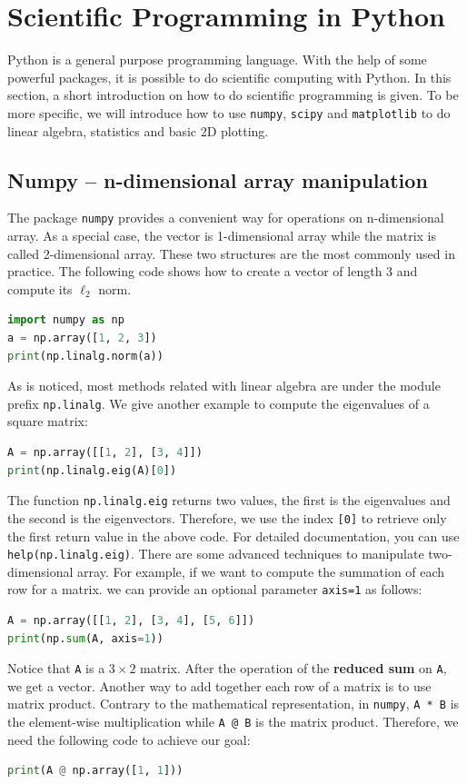 \documentclass[10pt]{article}
\begin{document}
\section{Scientific Programming in Python}
Python is a general purpose programming language.
With the help of some powerful packages, it is
possible to do scientific computing with Python.
In this section, a short introduction on how to
do scientific programming is given. To be more
specific, we will introduce how to use \texttt{numpy},
\texttt{scipy} and \texttt{matplotlib} to do linear algebra, statistics and basic 2D plotting.
\subsection{Numpy -- n-dimensional array manipulation}
The package \texttt{numpy} provides a convenient way for operations on n-dimensional array. As a special case, the vector is 1-dimensional array while the matrix is called 2-dimensional array. These two structures are the most commonly
used in practice. The following code shows how to create a vector of length 3 and compute its $\ell_2$ norm.
\begin{lstlisting}[language=Python]
import numpy as np
a = np.array([1, 2, 3])
print(np.linalg.norm(a))
\end{lstlisting}
As is noticed, most methods related with linear algebra are
under the module prefix \texttt{np.linalg}. We give another example to compute the eigenvalues of a square matrix:
\begin{lstlisting}[language=Python,firstnumber=4]
A = np.array([[1, 2], [3, 4]])
print(np.linalg.eig(A)[0])
\end{lstlisting}
The function \texttt{np.linalg.eig} returns two values,
the first is the eigenvalues and the second is the eigenvectors. Therefore, we use the index \texttt{[0]} to retrieve
only the first return value in the above code.
For detailed documentation, you can use \texttt{help(np.linalg.eig)}.
There are some advanced techniques to manipulate two-dimensional array. For example, if we want to compute
the summation of each row for a matrix. we can provide an
optional parameter \texttt{axis=1} as follows:
\begin{lstlisting}[language=Python, firstnumber=6]
A = np.array([[1, 2], [3, 4], [5, 6]])
print(np.sum(A, axis=1))
\end{lstlisting}
Notice that \texttt{A} is a $3 \times 2$ matrix. After the
operation of the \textbf{reduced sum} on \texttt{A}, we get a vector.
Another way to add together each row of
a matrix is to use matrix product.
Contrary to the mathematical representation, in \texttt{numpy},
\texttt{A * B} is the element-wise multiplication while \texttt{A @ B} is the
matrix product. Therefore, we need the
following code to achieve our goal:
\begin{lstlisting}[language=Python,firstnumber=8]
print(A @ np.array([1, 1]))
\end{lstlisting}
\end{document}
